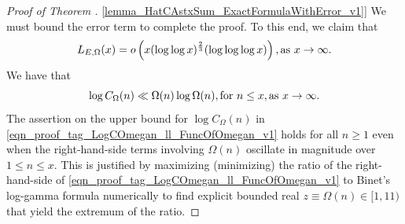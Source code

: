 \documentclass[11pt,reqno,a4letter]{article}
\newcommand{\hlocalref}[1]{\hyperref[#1]{\ref{#1}}}
\numberwithin{equation}{section}
\numberwithin{figure}{section}
\numberwithin{table}{section}
\theoremstyle{plain}
\numberwithin{theorem}{section}
\theoremstyle{definition}
\theoremstyle{remark}
\newcommand{\mathtext}[1]{\text{\rm #1}}
\begin{document}
\begin{proof}[Proof of Theorem \hlocalref{lemma_HatCAstxSum_ExactFormulaWithError_v1}]
We must bound the error term to complete the proof. To this end, we claim that 
\begin{equation}
\label{eqn_proof_tag_PartialSumsOver_HatCkx_EquivCond_v2}
L_{E,\Omega}(x) = o\left(x (\log\log x)^{\frac{2}{3}} (\log\log\log x)\right), 
     \mathtext{ as } x \rightarrow \infty. 
\end{equation}
We have that 
\begin{equation}
\label{eqn_proof_tag_LogCOmegan_ll_FuncOfOmegan_v1}
\log C_{\Omega}(n) \ll \Omega(n) \log \Omega(n), \mathtext{ for } n \leq x, 
     \mathtext{ as } x \rightarrow \infty. 
\end{equation}
The assertion on the upper bound for $\log C_{\Omega}(n)$ in 
\eqref{eqn_proof_tag_LogCOmegan_ll_FuncOfOmegan_v1} holds 
for all $n \geq 1$ even when the right-hand-side terms involving $\Omega(n)$ 
oscillate in magnitude over $1 \leq n \leq x$. This is justified by 
maximizing (minimizing) the ratio of the right-hand-side of 
\eqref{eqn_proof_tag_LogCOmegan_ll_FuncOfOmegan_v1} to 
Binet's log-gamma formula numerically to find explicit bounded real 
$z \equiv \Omega(n) \in [1, 11)$ 
that yield the extremum of the ratio.


\end{proof}
\end{document}
